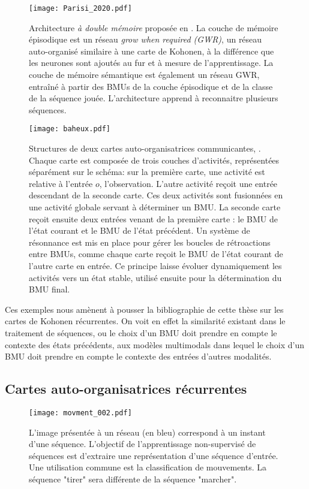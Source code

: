 \documentclass[../main]{subfiles}
\begin{document}
\begin{figure}
    \centering
    \texttt{[image: Parisi\_2020.pdf]}
    \caption{Architecture \emph{à double mémoire} proposée en \cite{parisiLL}. La couche de mémoire épisodique est un réseau \emph{grow when required (GWR)}, un réseau auto-organisé similaire à une carte de Kohonen, à la différence que les neurones sont ajoutés au fur et à mesure de l'apprentissage. La couche de mémoire sémantique est également un réseau GWR, entraîné à partir des BMUs de la couche épisodique et de la classe de la séquence jouée. L'architecture apprend à reconnaitre plusieurs séquences.\label{fig:gdm_parisi}}
\end{figure}

\begin{figure}
    \centering
    \texttt{[image: baheux.pdf]}
    \caption{Structures de deux cartes auto-organisatrices communicantes, \cite{baheux_towards_2014}. Chaque carte est composée de trois couches d'activités, représentées séparément sur le schéma: sur la première carte, une activité est relative à l'entrée $o$, l'observation. L'autre activité reçoit une entrée descendant de la seconde carte. Ces deux activités sont fusionnées en une activité globale servant à déterminer un BMU. La seconde carte reçoit ensuite deux entrées venant de la première carte : le BMU de l'état courant et le BMU de l'état précédent. Un système de résonnance est mis en place pour gérer les boucles de rétroactions entre BMUs, comme chaque carte reçoit le BMU de l'état courant de l'autre carte en entrée. Ce principe laisse évoluer dynamiquement les activités vers un état stable, utilisé ensuite pour la détermination du BMU final.\label{fig:baheux}}
\end{figure}

Ces exemples nous amènent à pousser la bibliographie de cette thèse sur les cartes de Kohonen récurrentes. On voit en effet la similarité existant dans le traitement de séquences, ou le choix d'un BMU doit prendre en compte le contexte des états précédents, aux modèles multimodals dans lequel le choix d'un BMU doit prendre en compte le contexte des entrées d'autres modalités. 

\subsection{Cartes auto-organisatrices récurrentes}

\begin{figure}
   \centering\texttt{[image: movment\_002.pdf]}
   \caption{L'image présentée à un réseau (en bleu) correspond à un instant d'une séquence. L'objectif de l'apprentissage non-supervisé de séquences est d'extraire une représentation d'une séquence d'entrée. Une utilisation commune est la classification de mouvements. La séquence "tirer" sera différente de la séquence "marcher".\label{fig:mouvement}}
\end{figure}
\end{document}
